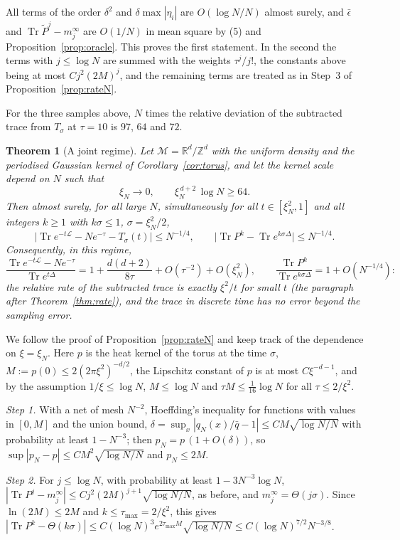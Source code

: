 \documentclass[11pt,a4paper]{article}
\makeatletter
\theoremstyle{stmt}
\newtheorem{theorem}{Theorem}[section]
\theoremstyle{defn}
\theoremstyle{rmk}
\renewenvironment{proof}[1][\proofname]{\par\pushQED{\qed}\normalfont\topsep6\p@\@plus6\p@\relax
  \trivlist\item[\hskip\labelsep{\sffamily\itshape\small #1.}]\ignorespaces}{\popQED\endtrivlist\@endpefalse}
\numberwithin{equation}{section}
\DeclareMathOperator{\Tr}{Tr}
\newcommand{\M}{\mathcal{M}}
\newcommand{\Lc}{\mathcal{L}}
\newcommand{\R}{\mathbb{R}}
\makeatother
\begin{document}
{\begin{proof}
All terms of the order $\delta^2$ and $\delta\max|\eta_i|$ are $O(\log N/N)$ almost surely, and $\bar\epsilon$ and $\Tr\tilde P^j-m_j^\infty$ are $O(1/N)$ in mean square by (5) and Proposition~\ref{prop:oracle}. This proves the first statement. In the second the terms with $j\le\log N$ are summed with the weights $\tau^j/j!$, the constants above being at most $Cj^2(2M)^j$, and the remaining terms are treated as in Step~3 of Proposition~\ref{prop:rateN}.
\end{proof}

For the three samples above, $N$ times the relative deviation of the subtracted trace from $T_\sigma$ at $\tau=10$ is $97$, $64$ and $72$.

\begin{theorem}[A joint regime]\label{thm:jointslow}
Let $\M=\R^d/\mathbb Z^d$ with the uniform density and the periodised Gaussian kernel of Corollary~\ref{cor:torus}, and let the kernel scale depend on $N$ such that
\[
\xi_N\to0,\qquad\xi_N^{\,d+2}\,\log N\ge64 .
\]
Then almost surely, for all large $N$, simultaneously for all $t\in[\xi_N^2,1]$ and all integers $k\ge1$ with $k\sigma\le1$, $\sigma=\xi_N^2/2$,
\[
\big|\Tr e^{-t\Lc}-Ne^{-\tau}-T_\sigma(t)\big|\le N^{-1/4},\qquad\big|\Tr P^k-\Tr e^{k\sigma\Delta}\big|\le N^{-1/4}.
\]
Consequently, in this regime,
\[
\frac{\Tr e^{-t\Lc}-Ne^{-\tau}}{\Tr e^{t\Delta}}=1+\frac{d(d+2)}{8\tau}+O(\tau^{-2})+O(\xi_N^2),\qquad\frac{\Tr P^k}{\Tr e^{k\sigma\Delta}}=1+O(N^{-1/4}):
\]
the relative rate of the subtracted trace is exactly $\xi^2/t$ for small $t$ (the paragraph after Theorem~\ref{thm:rate}), and the trace in discrete time has no error beyond the sampling error.
\end{theorem}

\begin{proof}
We follow the proof of Proposition~\ref{prop:rateN} and keep track of the dependence on $\xi=\xi_N$. Here $p$ is the heat kernel of the torus at the time $\sigma$, $M:=p(0)\le2(2\pi\xi^2)^{-d/2}$, the Lipschitz constant of $p$ is at most $C\xi^{-d-1}$, and by the assumption $1/\xi\le\log N$, $M\le\log N$ and $\tau M\le\tfrac1{16}\log N$ for all $\tau\le2/\xi^2$.

\emph{Step 1.} With a net of mesh $N^{-2}$, Hoeffding's inequality for functions with values in $[0,M]$ and the union bound, $\delta=\sup_x|q_N(x)/\bar q-1|\le CM\sqrt{\log N/N}$ with probability at least $1-N^{-3}$; then $p_N=p\,(1+O(\delta))$, so $\sup|p_N-p|\le CM^2\sqrt{\log N/N}$ and $p_N\le2M$.

\emph{Step 2.} For $j\le\log N$, with probability at least $1-3N^{-3}\log N$, $|\Tr P^j-m_j^\infty|\le Cj^2(2M)^{j+1}\sqrt{\log N/N}$, as before, and $m_j^\infty=\Theta(j\sigma)$. Since $\ln(2M)\le2M$ and $k\le\tau_{\max}=2/\xi^2$, this gives $|\Tr P^k-\Theta(k\sigma)|\le C(\log N)^3e^{2\tau_{\max}M}\sqrt{\log N/N}\le C(\log N)^{7/2}N^{-3/8}$.


\end{proof}}
\end{document}
